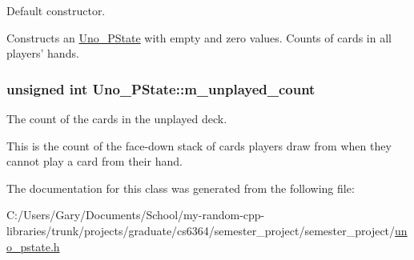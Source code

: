\-Default constructor. 

\-Constructs an \hyperlink{class_uno___p_state}{\-Uno\-\_\-\-P\-State} with empty and zero values. \-Counts of cards in all players' hands. \hypertarget{class_uno___p_state_ab5532c7fefcd10fc39a7a07b627ff5c5}{
\subsubsection[{m\-\_\-unplayed\-\_\-count}]{\setlength{\rightskip}{0pt plus 5cm}unsigned int {\bf \-Uno\-\_\-\-P\-State\-::m\-\_\-unplayed\-\_\-count}}}
\label{class_uno___p_state_ab5532c7fefcd10fc39a7a07b627ff5c5}


\-The count of the cards in the unplayed deck. 

\-This is the count of the face-\/down stack of cards players draw from when they cannot play a card from their hand. 

\-The documentation for this class was generated from the following file\-:\begin{DoxyCompactItemize}
\item 
\-C\-:/\-Users/\-Gary/\-Documents/\-School/my-\/random-\/cpp-\/libraries/trunk/projects/graduate/cs6364/semester\-\_\-project/semester\-\_\-project/\hyperlink{uno__pstate_8h}{uno\-\_\-pstate.\-h}\end{DoxyCompactItemize}
